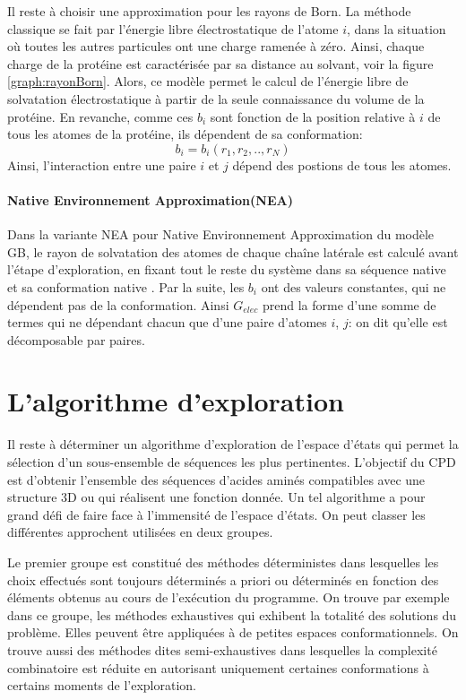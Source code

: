 Il reste à choisir une approximation pour les rayons de Born. La méthode classique se fait par l'énergie libre électrostatique de l'atome $i$, dans la situation où toutes les autres particules ont une charge ramenée à zéro. Ainsi, chaque charge de la protéine est caractérisée par sa distance au solvant, voir la figure \ref{graph:rayonBorn}. Alors, ce modèle permet le calcul de l'énergie libre de solvatation électrostatique à partir de la seule connaissance du volume de la protéine. En revanche, comme ces $b_i$ sont fonction de la position relative à $i$ de tous les atomes de la protéine, ils dépendent de sa conformation:
\begin{displaymath}
b_i=b_i(r_1,r_2,..,r_N)
\end{displaymath}
Ainsi, l'interaction entre une paire $i$ et $j$ dépend des postions de tous les atomes.
\paragraph{\og Native Environnement Approximation\fg (NEA)}
\label{NEA}
Dans la variante NEA pour \og Native Environnement Approximation \fg  du modèle GB, le rayon de solvatation des atomes de chaque chaîne latérale est calculé avant l'étape d'exploration, en fixant tout le reste du système dans sa séquence native et sa conformation native \cite{Polydorides11,Simonson13,Gaillard14}. Par la suite, les $b_i$ ont des valeurs constantes, qui ne dépendent pas de la conformation. Ainsi $G_{elec}$ prend la forme d'une somme de termes qui ne dépendant chacun que d'une paire d'atomes $i$, $j$: on dit qu'elle est \og décomposable par paires\fg.

\section{L'algorithme d'exploration}

Il reste à déterminer un algorithme d'exploration de l'espace d'états qui permet la sélection d'un sous-ensemble de séquences les plus pertinentes. L'objectif du CPD est d'obtenir l'ensemble des séquences d'acides aminés compatibles avec une structure 3D ou qui réalisent une fonction donnée. Un tel algorithme a pour grand défi de faire face à l'immensité de l'espace d'états. On peut classer les différentes approchent utilisées en deux groupes.

Le premier groupe est constitué des méthodes déterministes dans lesquelles les choix effectués sont toujours déterminés a priori ou déterminés en fonction des éléments obtenus au cours de l'exécution du programme. On trouve par exemple dans ce groupe, les méthodes exhaustives qui exhibent la totalité des solutions du problème. Elles peuvent être appliquées à de petites espaces conformationnels. On trouve aussi des méthodes dites semi-exhaustives dans lesquelles la complexité combinatoire est réduite en autorisant uniquement certaines conformations à certains moments de l'exploration.

